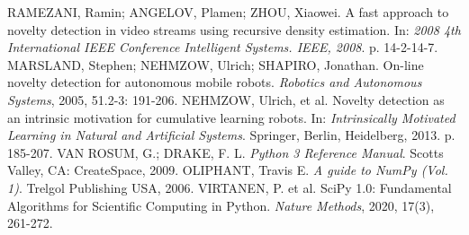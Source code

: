 \documentclass[11pt,twoside,openright]{report}
\let\cleardoublepage=\clearpage
\begin{document}
\begin{thebibliography}{L}
RAMEZANI, Ramin; ANGELOV, Plamen; ZHOU, Xiaowei. A fast approach to novelty detection in video streams using recursive density estimation. In: \textit{2008 4th International IEEE Conference Intelligent Systems. IEEE, 2008}. p. 14-2-14-7.
MARSLAND, Stephen; NEHMZOW, Ulrich; SHAPIRO, Jonathan. On-line novelty detection for autonomous mobile robots. \textit{Robotics and Autonomous Systems}, 2005, 51.2-3: 191-206.
NEHMZOW, Ulrich, et al. Novelty detection as an intrinsic motivation for cumulative learning robots. In: \textit{Intrinsically Motivated Learning in Natural and Artificial Systems}. Springer, Berlin, Heidelberg, 2013. p. 185-207.
VAN ROSUM, G.; DRAKE, F. L. \textit{Python 3 Reference Manual}. Scotts Valley, CA: CreateSpace, 2009.
OLIPHANT, Travis E. \textit{A guide to NumPy (Vol. 1)}. Trelgol Publishing USA, 2006.
VIRTANEN, P. et al.  SciPy 1.0: Fundamental Algorithms for Scientific Computing in Python. \textit{Nature Methods}, 2020, 17(3), 261-272.
\end{thebibliography}
\cleardoublepage
\thispagestyle{empty}\

\newpage
\end{document}
